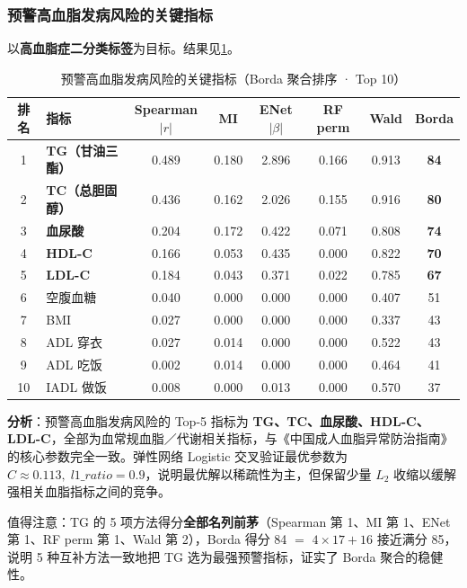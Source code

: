\documentclass{MathorCupmodeling}
\begin{document}
\subsubsection{预警高血脂发病风险的关键指标}

以\textbf{高血脂症二分类标签}为目标。结果见\cref{tab:q1-risk}。

\begin{table}[H]
\centering\small
\caption{预警高血脂发病风险的关键指标（Borda 聚合排序 · Top 10）}\label{tab:q1-risk}
\begin{tabular}{@{}c l c c c c c c@{}}
\toprule
排名 & 指标 & Spearman$|r|$ & MI & ENet$|\beta|$ & RF perm & Wald & \textbf{Borda} \\
\midrule
1  & \textbf{TG（甘油三酯）}  & 0.489 & 0.180 & 2.896 & 0.166 & 0.913 & \textbf{84} \\
2  & \textbf{TC（总胆固醇）}  & 0.436 & 0.162 & 2.026 & 0.155 & 0.916 & \textbf{80} \\
3  & \textbf{血尿酸}          & 0.204 & 0.172 & 0.422 & 0.071 & 0.808 & \textbf{74} \\
4  & \textbf{HDL-C}           & 0.166 & 0.053 & 0.435 & 0.000 & 0.822 & \textbf{70} \\
5  & \textbf{LDL-C}           & 0.184 & 0.043 & 0.371 & 0.022 & 0.785 & \textbf{67} \\
6  & 空腹血糖                 & 0.040 & 0.000 & 0.000 & 0.000 & 0.407 & 51 \\
7  & BMI                      & 0.027 & 0.000 & 0.000 & 0.000 & 0.337 & 43 \\
8  & ADL 穿衣                 & 0.027 & 0.014 & 0.000 & 0.000 & 0.522 & 43 \\
9  & ADL 吃饭                 & 0.002 & 0.014 & 0.000 & 0.000 & 0.464 & 41 \\
10 & IADL 做饭                & 0.008 & 0.000 & 0.013 & 0.000 & 0.570 & 37 \\
\bottomrule
\end{tabular}
\end{table}

\textbf{分析}：预警高血脂发病风险的 Top-5 指标为 \textbf{TG、TC、血尿酸、HDL-C、LDL-C}，全部为血常规血脂／代谢相关指标，与《中国成人血脂异常防治指南》的核心参数完全一致。弹性网络 Logistic 交叉验证最优参数为 $C \approx 0.113,\; l1\_ratio=0.9$，说明最优解以稀疏性为主，但保留少量 $L_2$ 收缩以缓解强相关血脂指标之间的竞争。

值得注意：TG 的 5 项方法得分\textbf{全部名列前茅}（Spearman 第 1、MI 第 1、ENet 第 1、RF perm 第 1、Wald 第 2），Borda 得分 84 $=$ $4 \times 17 + 16$ 接近满分 85，说明 5 种互补方法一致地把 TG 选为最强预警指标，证实了 Borda 聚合的稳健性。
\end{document}
